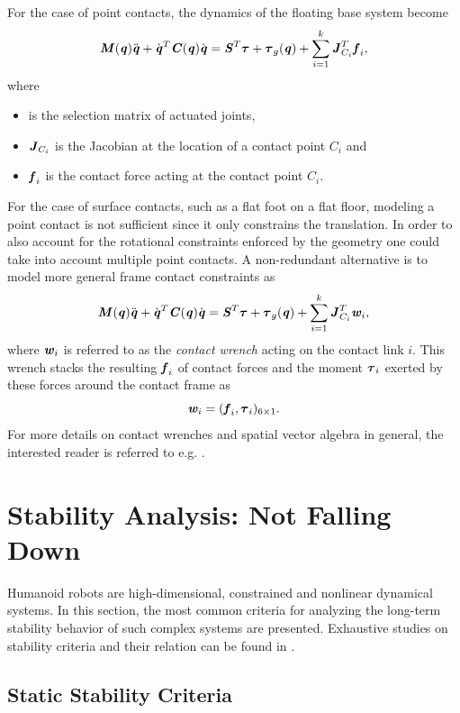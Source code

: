 For the case of point contacts, the dynamics of the floating base system become
\begin{equation*} \label{eqn:EoMLeggedRobotPtContact}
\bm{\mathit{M}}(\bm{\mathit{q}})\ddot{\bm{\mathit{q}}}+\dot{\bm{\mathit{q}}}^T\bm{\mathit{C}}(\bm{\mathit{q}})\dot{\bm{\mathit{q}}}=\bm{\mathit{S}}^T\bm{\mathit{\tau}}+\bm{\mathit{\tau}}_g(\bm{\mathit{q}})+\sum_{i=1}^{k}\bm{\mathit{J}}_{C_i}^T\bm{\mathit{f}}_i,
\end{equation*}
where 
\begin{itemize}
\item {} is the selection matrix of actuated joints,
\item $\bm{\mathit{J}}_{C_i}$ is the Jacobian at the location of a contact point $C_i$ and
\item $\bm{\mathit{f}}_i$ is the contact force acting at the contact point $C_i$.
\end{itemize}
For the case of surface contacts, such as a flat foot on a flat floor, modeling a point contact is not sufficient since it only constrains the translation. In order to also account for the rotational constraints enforced by the geometry one could take into account multiple point contacts. A non-redundant alternative is to model more general frame contact constraints as
\begin{equation} \label{eqn:EoMLeggedRobotSurfaceContact}
\bm{\mathit{M}}(\bm{\mathit{q}})\ddot{\bm{\mathit{q}}}+\dot{\bm{\mathit{q}}}^T\bm{\mathit{C}}(\bm{\mathit{q}})\dot{\bm{\mathit{q}}}=\bm{\mathit{S}}^T\bm{\mathit{\tau}}+\bm{\mathit{\tau}}_g(\bm{\mathit{q}})+\sum_{i=1}^{k}\bm{\mathit{J}}_{C_i}^T\bm{\mathit{w}}_i,
\end{equation}
where $\bm{\mathit{w}}_i$ is referred to as the \textit{contact wrench} acting on the contact link $i$. This wrench stacks the resulting $\bm{\mathit{f}}_i$ of contact forces and the moment $\bm{\mathit{\tau}}_i$ exerted by these forces around the contact frame as
$$\bm{\mathit{w}}_i=(\bm{\mathit{f}}_i,\bm{\mathit{\tau}}_i)_{6\times 1}.$$ 
For more details on contact wrenches and spatial vector algebra in general, the interested reader is referred to e.g. \cite[Ch.2]{featherstone2014rigid}.


\section{Stability Analysis: Not Falling Down}\label{sec:TheoryStability}
Humanoid robots are high-dimensional, constrained and nonlinear dynamical systems. In this section, the most common criteria  for analyzing the long-term stability behavior of such complex systems are presented. Exhaustive studies on stability criteria and their relation can be found in \cite{garcia2002classification, dekker2009zero, siciliano2016springer}.

\subsection{Static Stability Criteria}
